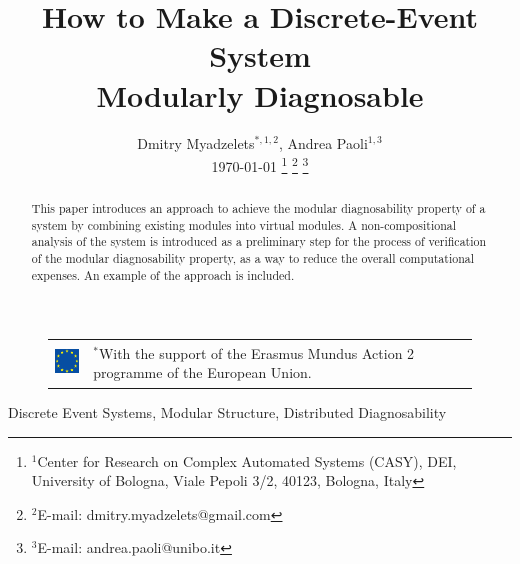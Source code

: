 \documentclass[a4paper, 10pt, conference]{ieeeconf}
\begin{document}
\title{How to Make a Discrete-Event System \\ Modularly Diagnosable}
\author{Dmitry Myadzelets$^{*,1,2}$, Andrea Paoli$^{1,3}$
\\ \today
\thanks{$^{1}$Center for Research on Complex Automated Systems (CASY), DEI,
University of Bologna, Viale Pepoli 3/2, 40123, Bologna, Italy}
	\thanks{$^{2}$E-mail: {dmitry.myadzelets@gmail.com}}
	\thanks{$^{3}$E-mail: {andrea.paoli@unibo.it}}
}
\maketitle

\begin{figure}[!b]
\begin{tabular}{l p{60mm}}
 	\includegraphics[height=10mm]{EU_flag.eps}
 	& \vspace{-10mm} \footnotesize
 	$^{*}$With the support of the Erasmus Mundus Action 2 programme of the
 	European Union.
\end{tabular}
\end{figure}

\begin{abstract}
This paper introduces an approach to achieve the modular diagnosability property
of a system by combining existing modules into virtual modules. A
non-compositional analysis of the system is introduced as a preliminary step for
the process of verification of the modular diagnosability property, as a way to
reduce the overall computational expenses. An example of the approach is
included.
\end{abstract}

\begin{keywords}
Discrete Event Systems, Modular Structure, Distributed Diagnosability
\end{keywords}

\newtheorem{assumption}{Assumption}
\newtheorem{definition}{Definition}
\newtheorem{conjecture}{Conjecture}
\newtheorem{lemma}{Lemma}
\newtheorem{corollary}{Corollary}
\newtheorem{example}{Example}
\newtheorem{theorem}{Theorem}
\end{document}
